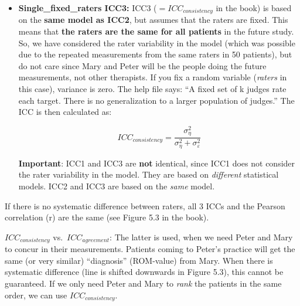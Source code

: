 \documentclass[
]{book}
\begin{document}
\begin{itemize}
  \[ICC_{agreement} = \frac{\sigma_{\eta}^2}{\sigma_{\eta}^2 +\mathbf{\sigma_{rater}^2} + \sigma_{\varepsilon}^2}\]
\item
  \textbf{Single\_fixed\_raters ICC3:}
  ICC3 (\(=ICC_{consistency}\) in the book) is based on the \textbf{same model as ICC2},
  but assumes that the raters are fixed.
  This means that \textbf{the raters are the same for all patients} in the future study.
  So, we have considered the rater variability in the model
  (which was possible due to the repeated measurements from the same raters in 50 patients),
  but do not care since Mary and Peter will be the people doing the future
  measurements, not other therapists. If you fix a random variable
  (\emph{raters} in this case), variance is zero. The help file says:
  ``A fixed set of k judges rate each target.
  There is no generalization to a larger population of judges.''
  The ICC is then calculated as:

  \[ICC_{consistency} = \frac{\sigma_{\eta}^2}{\sigma_{\eta}^2 + \sigma_{\varepsilon}^2}\]

  \textbf{Important}: ICC1 and ICC3 are \textbf{not} identical, since ICC1 does not consider the rater variability
  in the model. They are based on \emph{different} statistical models.
  ICC2 and ICC3 are based on the \emph{same} model.
\end{itemize}

If there is no systematic difference between raters, all 3 ICCs and the Pearson
correlation (r) are the same (see Figure 5.3 in the book).

\(ICC_{consistency}\) vs.~\(ICC_{agreement}\):
The latter is used, when we need Peter and Mary to concur in their measurements.
Patients coming to Peter's practice will get the same (or very similar) ``diagnosis'' (ROM-value)
from Mary. When there is systematic difference (line is shifted downwards in Figure 5.3),
this cannot be guaranteed.
If we only need Peter and Mary to \emph{rank} the patients in the same order,
we can use \(ICC_{consistency}\).
\end{document}
